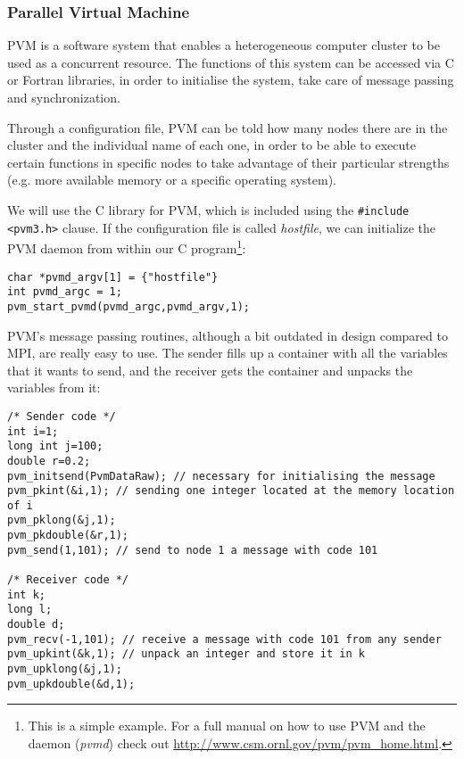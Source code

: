 \subsubsection{Parallel Virtual Machine}

PVM is a software system that enables a heterogeneous computer cluster to be used as a concurrent resource. The functions of this system can be accessed via C or Fortran libraries, in order to initialise the system, take care of message passing and synchronization.

Through a configuration file, PVM can be told how many nodes there are in the cluster and the individual name of each one, in order to be able to execute certain functions in specific nodes to take advantage of their particular strengths (e.g. more available memory or a specific operating system).

We will use the C library for PVM, which is included using the \texttt{\#include <pvm3.h>} clause. If the configuration file is called \emph{hostfile}, we can initialize the PVM daemon from within our C program\footnote{This is a simple example. For a full manual on how to use PVM and the daemon (\emph{pvmd}) check out \url{http://www.csm.ornl.gov/pvm/pvm_home.html}.}:
\begin{center}
\begin{minipage}{0.8\textwidth}
\begin{lstlisting}[caption={How to initialise the PVM daemon from inside a C program instead of initialising it prior to executing a program}]
char *pvmd_argv[1] = {"hostfile"}
int pvmd_argc = 1;
pvm_start_pvmd(pvmd_argc,pvmd_argv,1);
\end{lstlisting}
\end{minipage}
\end{center}

PVM's message passing routines, although a bit outdated in design compared to MPI, are really easy to use. The sender fills up a container with all the variables that it wants to send, and the receiver gets the container and unpacks the variables from it:
\begin{center}
\begin{minipage}{0.8\textwidth}
\begin{lstlisting}[caption={Example of message passing in PVM. The sender packs variables in a certain order that has to be respected by the receiver. The receiver might not want to unpack every variable received, however (e.g. unpack only the first two).}]
/* Sender code */
int i=1;
long int j=100;
double r=0.2;
pvm_initsend(PvmDataRaw); // necessary for initialising the message
pvm_pkint(&i,1); // sending one integer located at the memory location of i
pvm_pklong(&j,1);
pvm_pkdouble(&r,1);
pvm_send(1,101); // send to node 1 a message with code 101

/* Receiver code */
int k;
long l;
double d;
pvm_recv(-1,101); // receive a message with code 101 from any sender
pvm_upkint(&k,1); // unpack an integer and store it in k
pvm_upklong(&j,1);
pvm_upkdouble(&d,1);
\end{lstlisting}
\end{minipage}
\end{center}


